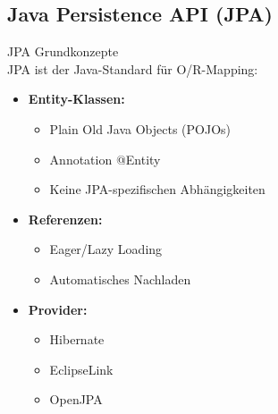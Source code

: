\subsection{Java Persistence API (JPA)}

\begin{concept}{JPA Grundkonzepte}\\
JPA ist der Java-Standard für O/R-Mapping:
\begin{itemize}
    \item \textbf{Entity-Klassen:}
    \begin{itemize}
        \item Plain Old Java Objects (POJOs)
        \item Annotation @Entity
        \item Keine JPA-spezifischen Abhängigkeiten
    \end{itemize}
    \item \textbf{Referenzen:}
    \begin{itemize}
        \item Eager/Lazy Loading
        \item Automatisches Nachladen
    \end{itemize}
    \item \textbf{Provider:}
    \begin{itemize}
        \item Hibernate
        \item EclipseLink
        \item OpenJPA
    \end{itemize}
\end{itemize}
\end{concept}

